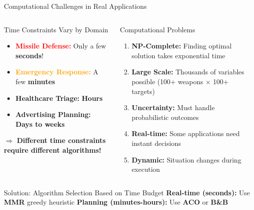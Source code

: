 \documentclass[aspectratio=43,8pt]{beamer}
\begin{document}
\begin{frame}{Computational Challenges in Real Applications}
\begin{columns}[t]
\begin{block}{Time Constraints Vary by Domain}
\begin{itemize}
    \item \textcolor{red}{\textbf{Missile Defense:}} Only a few \textbf{seconds}!
    \item \textcolor{orange}{\textbf{Emergency Response:}} A few \textbf{minutes}
    \item \textcolor{yellow!80!black}{\textbf{Healthcare Triage:}} \textbf{Hours}
    \item \textcolor{accentgreen}{\textbf{Advertising Planning:}} \textbf{Days to weeks}
\end{itemize}

\vspace{0.3cm}
$\Rightarrow$ \textbf{Different time constraints require different algorithms!}
\end{block}

\begin{alertblock}{Computational Problems}
\begin{enumerate}
    \item \textbf{NP-Complete:} Finding optimal solution takes exponential time
    \item \textbf{Large Scale:} Thousands of variables possible (100+ weapons $\times$ 100+ targets)
    \item \textbf{Uncertainty:} Must handle probabilistic outcomes
    \item \textbf{Real-time:} Some applications need instant decisions
    \item \textbf{Dynamic:} Situation changes during execution
\end{enumerate}
\end{alertblock}
\end{columns}

\vspace{0.3cm}
\begin{exampleblock}{Solution: Algorithm Selection Based on Time Budget}
\textbf{Real-time (seconds):} Use \textbf{MMR} greedy heuristic \quad
\textbf{Planning (minutes-hours):} Use \textbf{ACO} or \textbf{B\&B}
\end{exampleblock}
\end{frame}
\end{document}
